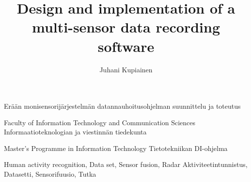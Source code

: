 \documentclass[english, numeric, fleqn, draft]{tauthesis}
\begin{document}

\frontmatter


\title{Design and implementation of a multi-sensor data recording software}
    {Erään monisensorijärjestelmän datannauhoitusohjelman suunnittelu ja toteutus}
\subtitle{}
    {}

\author{Juhani Kupiainen}


\finishdate{\year}{\month}{\day}


\facultyname
{ Faculty of Information Technology and Communication Sciences }
{ Informaatioteknologian ja viestinnän tiedekunta }

\programmename
{ Master's Programme in Information Technology }
{ Tietotekniikan DI-ohjelma }

\keywords%
    { Human activity recognition, Data set, Sensor fusion, Radar }
    { Aktiviteetintunnistus, Datasetti, Sensorifuusio, Tutka }

\maketitle

\end{document}
